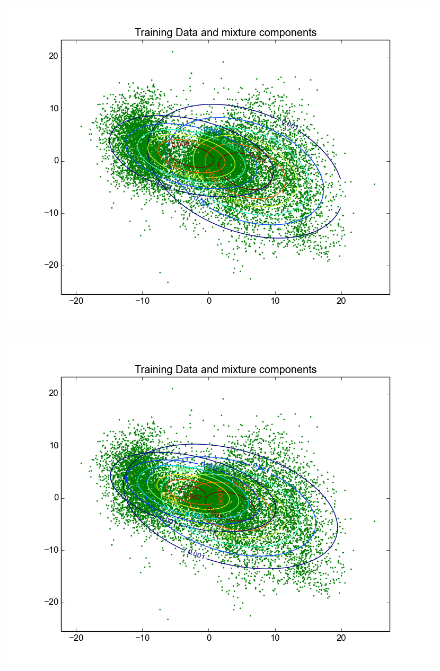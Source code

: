 \documentclass[11pt,a4paper]{article}
\begin{document}
\begin{minipage}[b]{0.25\textwidth}
\begin{figure}[H]
  \centering
  \includegraphics[width=.8\linewidth]{Figures/contours_digitsix15.png}

  \label{fig:sfig1}
\end{figure}%
\end{minipage}
\begin{minipage}[b]{0.25\textwidth}
\begin{figure}[H]
  \centering
  \includegraphics[width=.8\linewidth]{Figures/contours_digitsix20.png}

  \label{fig:sfig1}
\end{figure}%
\end{minipage}
\end{document}
